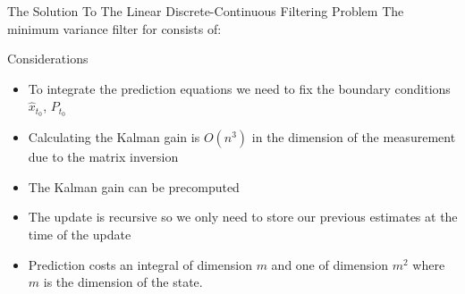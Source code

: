 \documentclass{beamer}
\begin{document}
\begin{frame}{The Solution To The Linear Discrete-Continuous Filtering Problem}
  The minimum variance filter for consists of: \\
\end{frame}

\begin{frame}{Considerations}
  \begin{itemize}
   \pause
\item To integrate the prediction equations we need to fix the boundary
  conditions $\hat{x}_{t_0}$, $P_{t_0}$
   \pause
  \item Calculating the Kalman gain is $O(n^3)$ in the dimension of the
    measurement due to the matrix inversion
    \pause
  \item The Kalman gain can be precomputed
    \pause 
\item The update is recursive so we only need to store our previous estimates at
  the time of the update
  \pause
 
\item Prediction costs an integral of dimension $m$ and one of dimension $m^2$
  where $m$ is the dimension of the state.
  \end{itemize}

\end{frame}
\end{document}
